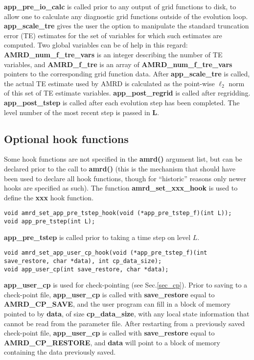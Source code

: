 \documentclass[aps,amssymb,unsortedaddress,nofootinbib]{revtex4}
\begin{document}
{\bf app\_pre\_io\_calc} is called prior to any output of grid functions to
disk, to allow one to calculate any diagnostic grid functions outside of the
evolution loop. {\bf app\_scale\_tre} gives the user the option to manipulate
the standard truncation error (TE) estimates for the
set of variables for which such estimates are computed. Two global variables
can be of help in this regard: {\bf AMRD\_num\_f\_tre\_vars} is an integer
describing the number of TE variables, and {\bf AMRD\_f\_tre} is an array of
{\bf AMRD\_num\_f\_tre\_vars} pointers to the corresponding grid function data.
After {\bf app\_scale\_tre} is called, the actual TE estimate used by AMRD
is calculated as the point-wise $\ell_2$ norm of this set of TE estimate variables.
{\bf app\_post\_regrid} is called after regridding. 
{\bf app\_post\_tstep} is called after each evolution
step has been completed. The level number of the most recent step is passed
in {\bf L}.

\subsection{Optional hook functions}\label{sec_op_hooks}
Some hook functions are not specified in the {\bf amrd()} 
argument list, but can be declared prior to the call to {\bf amrd()} 
(this is the mechanism that should have been used to declare all hook
functions, though for ``historic'' reasons only newer hooks are specified
as such). The function {\bf amrd\_set\_xxx\_hook} is used
to define the {\bf xxx} hook function.

\begin{verbatim}
void amrd_set_app_pre_tstep_hook(void (*app_pre_tstep_f)(int L));
void app_pre_tstep(int L);
\end{verbatim}

{\bf app\_pre\_tstep} is called prior to taking a time step on level $L$.

\begin{verbatim}
void amrd_set_app_user_cp_hook(void (*app_pre_tstep_f)(int save_restore, char *data), int cp_data_size);
void app_user_cp(int save_restore, char *data);
\end{verbatim}

{\bf app\_user\_cp} is used for check-pointing (see Sec.\ref{sec_cp}). Prior to saving to 
a check-point file, {\bf app\_user\_cp} is called with {\bf save\_restore} equal to 
{\bf AMRD\_CP\_SAVE}, and the user program can fill in a block of memory pointed to by {\bf data},
of size {\bf cp\_data\_size}, with any local state information that cannot be read from
the parameter file. After restarting from a previously saved check-point file,
{\bf app\_user\_cp} is called with {\bf save\_restore} equal to
{\bf AMRD\_CP\_RESTORE}, and {\bf data} will point to a block of memory containing the
data previously saved.
\end{document}
